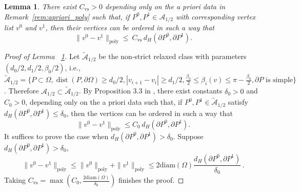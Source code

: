 \documentclass{article}
\newtheorem{lemma}[theorem]{Lemma}
\newcommand{\diam}{\mathrm{diam}}
\newcommand{\dist}{\operatorname{dist}}
\begin{document}
\begin{lemma}\label{lem:vertex_stability_poly}
There exist $C_{\mathrm{vs}}>0$ depending only on the a priori data in Remark~\ref{rem:apriori_poly} such that, if $P^0,P^1\in\mathcal A_{1/2}$ with corresponding vertex list $v^0$ and $v^1$, then their vertices can be ordered in such a way that 
\[
\|v^0-v^1\|_{\mathrm{poly}} \le\ C_{\mathrm{vs}}\, d_H(\partial P^0,\partial P^1).
\]
\end{lemma}
\begin{proof}[Proof of Lemma ~\ref{lem:vertex_stability_poly}]
Let $\widetilde{\mathcal{A}}_{1/2}$ be the non-strict relaxed class with parameters $(d_0/2, d_1/2, \beta_0/2)$, i.e., $\widetilde{\mathcal{A}}_{1/2} = \{P\subset \Omega, \dist(P, \partial \Omega) \geq d_0/2, |v_{i+1}-v_{i}|\geq d_1/2, \frac{\beta_0}{2} \leq \beta_i(v)\leq \pi-\frac{\beta_0}{2}, \partial P \text{ is simple} \}$. Therefore $\mathcal{A}_{1/2} \subset \widetilde{\mathcal{A}}_{1/2}$. 
By Proposition 3.3 in \citet{beretta2022global}, there exist constants $\delta_0>0$ and $C_{\mathrm{0}}>0$,
depending only on the a priori data such that, if $P^0,P^1\in \widetilde{\mathcal{A}}_{1/2} $ satisfy $d_H(\partial P^0,\partial P^1)\le \delta_0$, then the vertices can be ordered in such a way that 
\[
\|v^0-v^1\|_{\mathrm{poly}} \leq C_{0}\, d_H(\partial P^0,\partial P^1).
\]
It suffices to prove the case when $d_H(\partial P^0,\partial P^1) > \delta_0$. Suppose $d_H(\partial P^0,\partial P^1) > \delta_0$, 
\[
\|v^0-v^1\|_{\mathrm{poly}} \leq \|v^0\|_{\mathrm{poly}}+\|v^1\|_{\mathrm{poly}} \leq 2 \diam(\Omega) \frac{d_H(\partial P^0,\partial P^1)}{\delta_0} \,.
\]
Taking $C_{\mathrm{vs}} = \max(C_0,\frac{2\diam(\Omega)}{\delta_0} )$ finishes the proof.
\end{proof}
\end{document}
